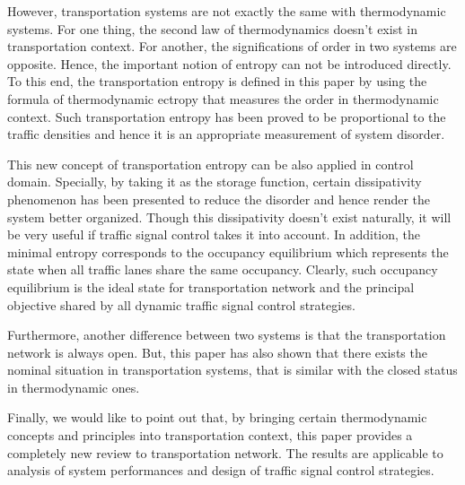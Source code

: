 \documentclass[preprint,authoryear,12pt]{elsarticle}
\begin{document}
However, transportation systems are not exactly the same with thermodynamic systems. For one thing, the second law of thermodynamics doesn't exist in transportation context. For another, the significations of order in two systems are opposite. Hence, the important notion of entropy can not be introduced directly. To this end, the transportation entropy is defined in this paper by using the formula of thermodynamic ectropy that measures the order in thermodynamic context. Such transportation entropy has been proved to be proportional to the traffic densities and hence it is an appropriate measurement of system disorder.

This new concept of transportation entropy can be also applied in control domain. Specially, by taking it as the storage function, certain dissipativity phenomenon has been presented to reduce the disorder and hence render the system better organized. Though this dissipativity doesn't exist naturally, it will be very useful if traffic signal control takes it into account.
In addition, the minimal entropy corresponds to the occupancy equilibrium which represents the state when all traffic lanes share the same occupancy. Clearly, such occupancy equilibrium is the ideal state for transportation network and the principal objective shared by all dynamic traffic signal control strategies.


Furthermore, another difference between two systems is that the transportation network is always open. But, this paper has also shown that there exists the nominal situation in transportation systems, that is similar with the closed status in thermodynamic ones.

Finally, we would like to point out that, by bringing certain thermodynamic concepts and principles into transportation context, this paper provides a completely new review to transportation network. The results are applicable to analysis of system performances and design of traffic signal control strategies.



\end{document}

